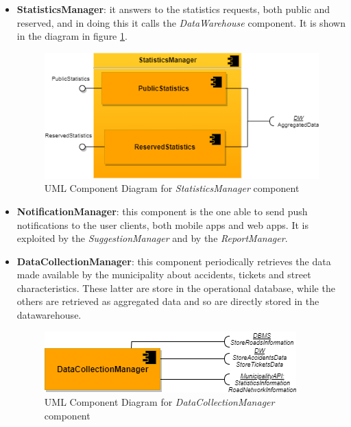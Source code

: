 \documentclass[a4paper]{report}
\begin{document}
\begin{itemize}
\item \textbf{StatisticsManager}: it answers to the statistics requests, both public and reserved, and in doing this it calls the \textit{DataWarehouse} component. It is shown in the diagram in figure \ref{fig:statisticsmgr-component}.

\begin{figure}[htp]
\includegraphics[width=\textwidth]{StatisticsManager}
\caption{UML Component Diagram for \textit{StatisticsManager} component}
\label{fig:statisticsmgr-component}
\end{figure}

\item \textbf{NotificationManager}: this component is the one able to send push notifications to the user clients, both mobile apps and web apps. It is exploited by the \textit{SuggestionManager} and by the \textit{ReportManager}.

\item \textbf{DataCollectionManager}: this component periodically retrieves the data made available by the municipality about accidents, tickets and street characteristics. These latter are store in the operational database, while the others are retrieved as aggregated data and so are directly stored in the datawarehouse.

\begin{figure}[htp]
\includegraphics[width=\textwidth]{DataCollectionManager2}
\caption{UML Component Diagram for \textit{DataCollectionManager} component}
\label{fig:datacollectionmgr-component}
\end{figure}


\end{itemize}
\end{document}

